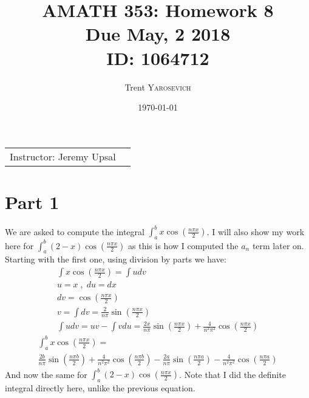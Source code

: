 \documentclass{article}
\title{AMATH 353: Homework 8 \\Due May, 2 2018 \\ ID: 1064712} %
\author{Trent \textsc{Yarosevich}} %
\date{\today} %
\begin{document}
\maketitle %
\setlength\parindent{1cm}

\begin{center}
\begin{tabular}{l r}
Instructor: Jeremy Upsal %
\end{tabular}
\end{center}


\section*{Part 1}
We are asked to compute the integral $\int_a^b x\cos(\frac{n\pi x}{2})$. I will also show my work here for $\int_a^b (2-x)\cos(\frac{n\pi x}{2})$ as this is how I computed the $a_n$ term later on. Starting with the first one, using division by parts we have:
\begin{equation}
\begin{aligned}
\int x\cos(\frac{n\pi x}{2}) = \int udv\\
u = x \; , \; du = dx\\
dv = \cos(\frac{n\pi x}{2})\\
v = \int dv = \frac{2}{n\pi}\sin(\frac{n\pi x}{2})\\
\int udv = uv - \int vdu = \frac{2x}{n\pi}\sin(\frac{n\pi x}{2}) + \frac{4}{n^2\pi^2}\cos(\frac{n\pi x}{2})
\end{aligned}
\end{equation}
\begin{multline}
\int_a^b x\cos(\frac{n\pi x}{2}) = \\ \frac{2b}{n\pi}\sin(\frac{n\pi b}{2}) + \frac{4}{n^2\pi^2}\cos(\frac{n\pi b}{2}) - \frac{2a}{n\pi}\sin(\frac{n\pi a}{2}) - \frac{4}{n^2\pi^2}\cos(\frac{n\pi a}{2})
\end{multline}
And now the same for $\int_a^b (2-x)\cos(\frac{n\pi x}{2})$. Note that I did the definite integral directly here, unlike the previous equation.
\begin{equation}
\begin{aligned}

\end{aligned}
\end{equation}
\end{document}
